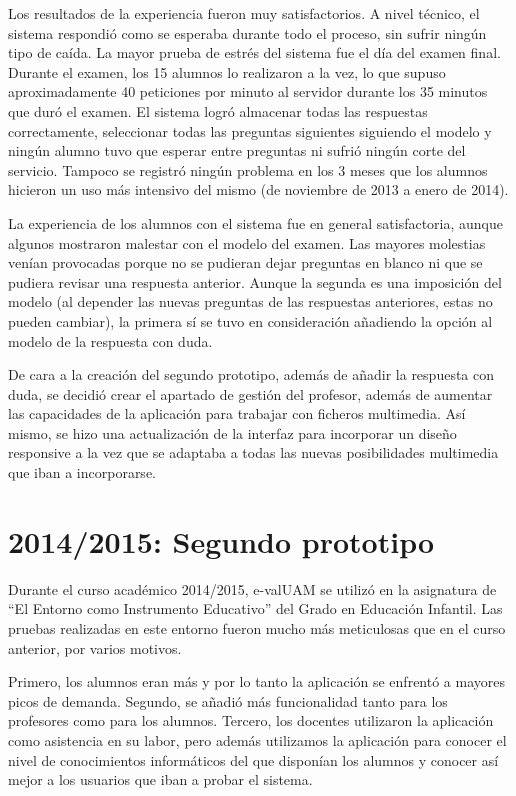 Los resultados de la experiencia fueron muy satisfactorios. A nivel técnico, el sistema respondió como se esperaba durante todo el proceso, sin sufrir ningún tipo de caída. La mayor prueba de estrés del sistema fue el día del examen final. Durante el examen, los 15 alumnos lo realizaron a la vez, lo que supuso aproximadamente 40 peticiones por minuto al servidor durante los 35 minutos que duró el examen. El sistema logró almacenar todas las respuestas correctamente, seleccionar todas las preguntas siguientes siguiendo el modelo y ningún alumno tuvo que esperar entre preguntas ni sufrió ningún corte del servicio. Tampoco se registró ningún problema en los 3 meses que los alumnos hicieron un uso más intensivo del mismo (de noviembre de 2013 a enero de 2014).

La experiencia de los alumnos con el sistema fue en general satisfactoria, aunque algunos mostraron malestar con el modelo del examen. Las mayores molestias venían provocadas porque no se pudieran dejar preguntas en blanco ni que se pudiera revisar una respuesta anterior. Aunque la segunda es una imposición del modelo (al depender las nuevas preguntas de las respuestas anteriores, estas no pueden cambiar), la primera sí se tuvo en consideración añadiendo la opción al modelo de la respuesta con duda.

De cara a la creación del segundo prototipo, además de añadir la respuesta con duda, se decidió crear el apartado de gestión del profesor, además de aumentar las capacidades de la aplicación para trabajar con ficheros multimedia. Así mismo, se hizo una actualización de la interfaz para incorporar un diseño responsive a la vez que se adaptaba a todas las nuevas posibilidades multimedia que iban a incorporarse.

\section{2014/2015: Segundo prototipo}

Durante el curso académico 2014/2015, \acrshort{e-valUAM} se utilizó en la asignatura de ``El Entorno como Instrumento Educativo'' del Grado en Educación Infantil. Las pruebas realizadas en este entorno fueron mucho más meticulosas que en el curso anterior, por varios motivos. 

Primero, los alumnos eran más y por lo tanto la aplicación se enfrentó a mayores picos de demanda. Segundo, se añadió más funcionalidad tanto para los profesores como para los alumnos. Tercero, los docentes utilizaron la aplicación como asistencia en su labor, pero además utilizamos la aplicación para conocer el nivel de conocimientos informáticos del que disponían los alumnos y conocer así mejor a los usuarios que iban a probar el sistema.

